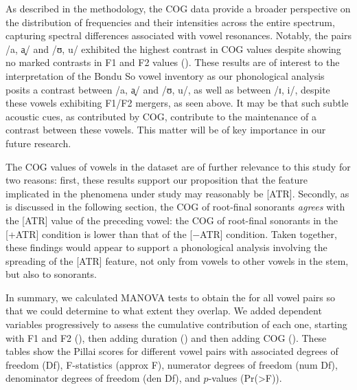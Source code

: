 \documentclass[output=paper,colorlinks,citecolor=brown]{langscibook}
\begin{document}
As described in the methodology, the COG  data provide a broader perspective on the distribution of frequencies and their intensities across the entire spectrum, capturing spectral differences associated with vowel resonances. Notably, the pairs /a, a̘/ and /ʊ, u/ exhibited the highest contrast in COG values despite showing no marked contrasts in F1 and F2 values (). These results are of interest to the interpretation of the Bondu So vowel inventory as our phonological analysis posits a contrast between /a, a̘/ and /ʊ, u/, as well as between /ɪ, i/, despite these vowels exhibiting F1/F2 mergers, as seen above. It may be that such subtle acoustic cues, as contributed by COG, contribute to the maintenance of a contrast between these vowels. This matter will be of key importance in our future research.

The COG values of vowels in the dataset are of further relevance to this study for two reasons: first, these results support our proposition that the feature implicated in the phenomena under study may reasonably be [ATR]. Secondly, as is discussed in the following section, the COG of root-final sonorants \textit{agrees} with the [ATR] value of the preceding vowel: the COG of root-final sonorants in the [+ATR] condition is lower than that of the [−ATR] condition. Taken together, these findings would appear to support a phonological analysis involving the spreading of the [ATR] feature, not only from vowels to other vowels in the stem, but also to sonorants. 

In summary, we calculated MANOVA tests to obtain the  for all vowel pairs so that we could determine to what extent they overlap. We added dependent variables progressively to assess the cumulative contribution of each one, starting with F1 and F2 (), then adding duration () and then adding COG (). These tables show the Pillai scores for different vowel pairs with associated degrees of freedom (Df), F-statistics (approx F), numerator degrees of freedom (num Df), denominator degrees of freedom (den Df), and $p$-values (Pr(>F)).
\end{document}
